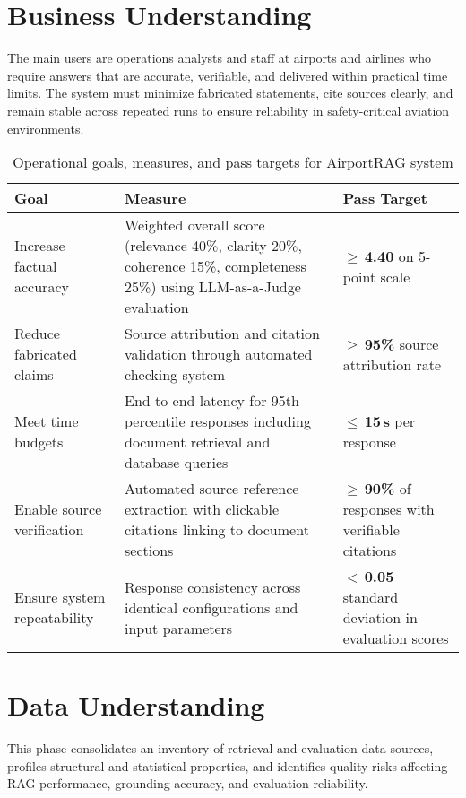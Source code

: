\section{Business Understanding}
\label{sec:business_s2}

The main users are operations analysts and staff at airports and airlines who require answers that are accurate, verifiable, and delivered within practical time limits. The system must minimize fabricated statements, cite sources clearly, and remain stable across repeated runs to ensure reliability in safety-critical aviation environments.

\begin{table}[H]
\centering
\caption{Operational goals, measures, and pass targets for AirportRAG system}
\label{tab:business_kpis_s2}
\begin{tabular}{|p{4.5cm}|p{6.2cm}|p{6.3cm}|}
\hline
\textbf{Goal} & \textbf{Measure} & \textbf{Pass Target} \\
\hline
Increase factual accuracy &
Weighted overall score (relevance 40\%, clarity 20\%, coherence 15\%, completeness 25\%) using LLM-as-a-Judge evaluation &
$\geq$\,\textbf{4.40} on 5-point scale \\
\hline
Reduce fabricated claims &
Source attribution and citation validation through automated checking system &
$\geq$\,\textbf{95\%} source attribution rate \\
\hline
Meet time budgets &
End-to-end latency for 95th percentile responses including document retrieval and database queries &
$\leq$\,\textbf{15\,s} per response \\
\hline
Enable source verification &
Automated source reference extraction with clickable citations linking to document sections &
$\geq$\,\textbf{90\%} of responses with verifiable citations \\
\hline
Ensure system repeatability &
Response consistency across identical configurations and input parameters &
$<$\,\textbf{0.05} standard deviation in evaluation scores \\
\hline
\end{tabular}
\end{table}

\section{Data Understanding}
\label{sec:data_understanding_s2}

This phase consolidates an inventory of retrieval and evaluation data sources, profiles structural and statistical properties, and identifies quality risks affecting RAG performance, grounding accuracy, and evaluation reliability.

